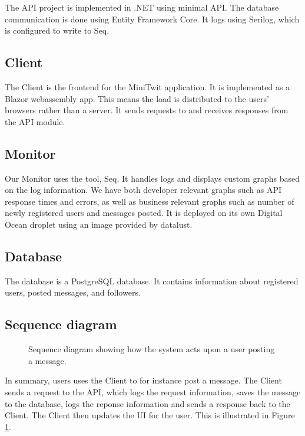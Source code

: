 The API project is implemented in .NET using minimal API.
The database communication is done using Entity Framework Core.
It logs using Serilog\cite{serilog}, 
which is configured to write to Seq\cite{seq}.

\subsection{Client}

The Client is the frontend for the MiniTwit application.
It is implemented as a Blazor webassembly app.
This means the load is distributed to the users' browsers 
rather than a server.
It sends requests to and receives responses from the API module.

\subsection{Monitor}

Our Monitor uses the tool, Seq\cite{seq}.
It handles logs and displays custom graphs based on 
the log information. We have both developer relevant 
graphs such as API response times and errors,
as well as business relevant graphs such as number 
of newly registered users and messages posted.
It is deployed on its own Digital Ocean droplet 
using an image provided by datalust\cite{seq}.

\subsection{Database}

The database is a PostgreSQL\cite{postgres} database.
It contains information about registered users,
posted messages, and followers.

\subsection{Sequence diagram}

\begin{figure}[H]
    \centering
    \makebox[\linewidth]{
    }
    \caption{Sequence diagram showing how the system acts upon 
    a user posting a message.}
    \label{fig:seq_diagram}
\end{figure}

In summary, users uses the Client to for instance post a message.
The Client sends a request to the API, which logs the request 
information, saves the message to the database, 
logs the reponse information and sends a response back to the 
Client. The Client then updates the UI for the user.
This is illustrated in Figure \ref{fig:seq_diagram}.
